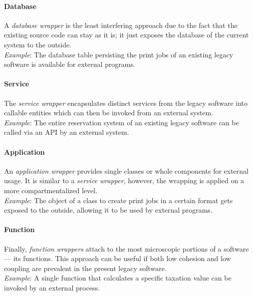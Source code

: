 \documentclass[12pt,a4paper,twoside]{report}
\begin{document}
\paragraph{Database}
A \textit{database wrapper} is the least interfering approach due to the fact that
the existing source code can stay as it is; it just exposes the database of the current system
to the outside.\\
\textit{Example}: The database table persisting the print jobs of an existing legacy software
is available for external programs.

\paragraph{Service}
The \textit{service wrapper} encapsulates distinct services from the legacy software
into callable entities which can then be invoked from an external system.\\
\textit{Example}: The entire reservation system of an existing legacy software
can be called via an API by an external system.

\paragraph{Application}
An \textit{application wrapper} provides single classes or whole components for external usage.
It is similar to a \textit{service wrapper}, however, the wrapping is applied on a more
compartmentalized level.\\
\textit{Example}: The object of a class to create print jobs in a certain format
gets exposed to the outside, allowing it to be used by external programs.

\paragraph{Function}
Finally, \textit{function wrappers} attach to the most microscopic portions of a software ---
its functions. This approach can be useful if both low cohesion and low coupling are prevalent
in the present legacy software.\\
\textit{Example}: A single function that calculates a specific taxation value
can be invoked by an external process.
\newline
\end{document}
